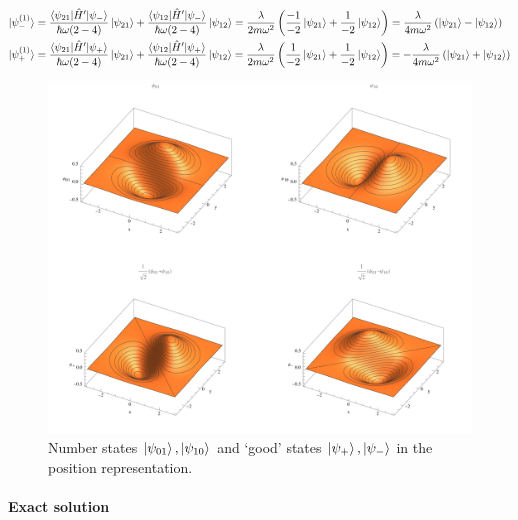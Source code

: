 \documentclass[10pt]{article}
\newcommand{\1}{\mathbf 1}
\begin{document}
\begin{align}
	\ket{\psi_-^{(1)}}
	&=
	\frac{\braket{\psi_{21} |\hat H' | \psi_{-} }}{\hbar \omega(2-4)}
	\ket{\psi_{21}}
	+
	\frac{\braket{\psi_{12} |\hat H' | \psi_{-} }}{\hbar \omega(2-4)}
	\ket{\psi_{12}}
	=
	\frac{\lambda}{2 m \omega^2}
	\left(
		\frac{-1}{-2}
		\ket{\psi_{21}}
		+
		\frac{1}{-2}
		\ket{\psi_{12}}
	\right)
	=
	\frac{\lambda}{4 m \omega^2}
	\left(
		\ket{\psi_{21}}
		-
		\ket{\psi_{12}}
	\right)\\
	\ket{\psi_+^{(1)}}
	&=
	\frac{\braket{\psi_{21} |\hat H' | \psi_{+} }}{\hbar \omega(2-4)}
	\ket{\psi_{21}}
	+
	\frac{\braket{\psi_{12} |\hat H' | \psi_{+} }}{\hbar \omega(2-4)}
	\ket{\psi_{12}}
	=
	\frac{\lambda}{2 m \omega^2}
	\left(
		\frac{1}{-2}
		\ket{\psi_{21}}
		+
		\frac{1}{-2}
		\ket{\psi_{12}}
	\right)
	=
	-
	\frac{\lambda}{4 m \omega^2}
	\left(
		\ket{\psi_{21}}
		+
		\ket{\psi_{12}}
	\right)
\end{align}
\begin{figure}
\centering
\includegraphics[width=\linewidth]{fig/grid.png}
\caption{Number states $\ket{\psi_{01}},\ket{\psi_{10}}$ and `good' states $\ket{\psi_{+}},\ket{\psi_{-}}$ in the position representation.
\label{visualizingGoodStates}
}
\end{figure}


\paragraph{Exact solution}
\end{document}
